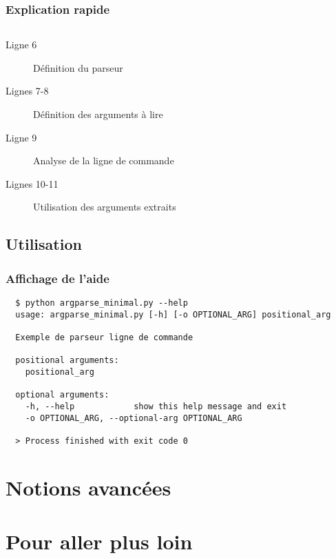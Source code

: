 \documentclass{beamer}
\begin{document}
\begin{frame}
 \frametitle{Explication rapide}
   
\inputminted[linenos=true, fontsize=\fontsize{3}{4}, frame=single]{python}{py_src/py_argparse/argparse_minimal.py}

\begin{description}
 \item[Ligne 6] Définition du parseur
 \item[Lignes 7-8] Définition des arguments à lire
 \item[Ligne 9] Analyse de la ligne de commande
 \item[Lignes 10-11] Utilisation des arguments extraits
\end{description}

\end{frame}

\subsection{Utilisation}

\begin{frame}[fragile]
 \frametitle{Affichage de l'aide}
 
  \begin{tcolorbox}[width=\textwidth,colback={ttybg},title={Console}, colupper=ttyfg]
  \begin{scriptsize}

  \begin{verbatim}
  $ python argparse_minimal.py --help
  usage: argparse_minimal.py [-h] [-o OPTIONAL_ARG] positional_arg

  Exemple de parseur ligne de commande

  positional arguments:
    positional_arg

  optional arguments:
    -h, --help            show this help message and exit
    -o OPTIONAL_ARG, --optional-arg OPTIONAL_ARG

  > Process finished with exit code 0 

  \end{verbatim}
  \end{scriptsize}
  
 \end{tcolorbox}

\end{frame}

\section{Notions avancées}

\section{Pour aller plus loin}
\end{document}
